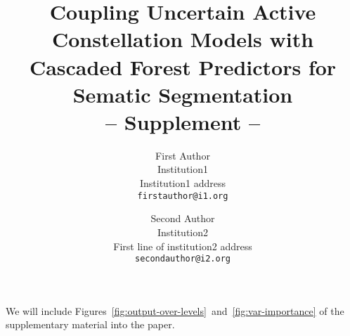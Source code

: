 \documentclass[10pt,twocolumn,letterpaper]{article}
\begin{document}
\title{Coupling Uncertain Active Constellation Models with \\
Cascaded Forest Predictors for Sematic Segmentation \\ -- Supplement --}

\author{First Author\\
Institution1\\
Institution1 address\\
{\tt\small firstauthor@i1.org}
\and
Second Author\\
Institution2\\
First line of institution2 address\\
{\tt\small secondauthor@i2.org}
}

\maketitle

We will include Figures~\ref{fig:output-over-levels}~and~\ref{fig:var-importance} of the supplementary material into the paper. 


\begin{figure*}[t]
\begin{center}
\caption{Output and smoothed output over levels }
\label{fig:output-over-levels}
\end{center}
\end{figure*}

\begin{figure*}[t]
\begin{center}
\caption{Variable Importance.}
\label{fig:var-importance}
\end{center}
\end{figure*}

\begin{figure*}[t]
\begin{center}
\caption{Individual methods as box plots with parallel coordinates.}
\label{fig:pcp-plots}
\end{center}
\end{figure*}
\end{document}
